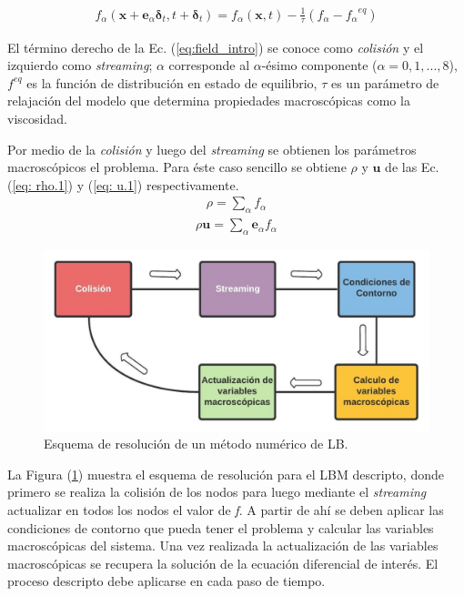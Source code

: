 \newpage


\begin{align}
	f_{\alpha} (\mathbf{x} + \mathbf{e}_{\alpha} \mathbf{\delta}_{t}, t + \mathbf{\delta}_{t})  = f_{\alpha} (\mathbf{x}, t) - \frac{1}{\tau} (f_{\alpha} - {f_{\alpha}}^{eq})
	\label{eq:field_intro} 
\end{align}

El término derecho de la Ec. (\ref{eq:field_intro}) se conoce como \textit{colisión} y el izquierdo como \textit{streaming}; $\alpha$ corresponde al  $\alpha$-ésimo componente  ($\alpha = 0, 1, ... ,8$), $f^{eq}$ es la función de distribución en estado de equilibrio, $\tau$ es un parámetro de relajación del modelo que determina propiedades macroscópicas como la viscosidad.

Por medio de la \textit{colisión} y luego del \textit{streaming} se obtienen los parámetros macroscópicos el problema. Para éste caso sencillo se obtiene $\rho$ y $\mathbf{u}$ de las Ec. (\ref{eq: rho.1}) y (\ref{eq: u.1}) respectivamente.
\begin{align}
	\rho = \sum_{\alpha} f_{\alpha}
	\label{eq: rho.1}
\end{align}
\begin{align}
	\rho \mathbf{u}= \sum_{\alpha} \mathbf{e}_{\alpha} f_{\alpha}
	\label{eq: u.1}
\end{align}

\begin{figure}[H]
	\centering
	\includegraphics[width=14cm]{figs/cap1/esquema_LBM}
	\caption{Esquema de resolución de un método numérico de LB.}
	\label{fig:esquema_lbm}
\end{figure}

La Figura (\ref{fig:esquema_lbm}) muestra el esquema de resolución para el LBM descripto, donde primero se realiza la colisión de los nodos para luego mediante el \textit{streaming} actualizar en todos los nodos el valor de \textit{f}. A partir de ahí se deben aplicar las condiciones de contorno que pueda tener el problema y calcular las variables macroscópicas del sistema. Una vez realizada la actualización de las variables macroscópicas se recupera la solución de la ecuación diferencial de interés. El proceso descripto debe aplicarse en cada paso de tiempo.


